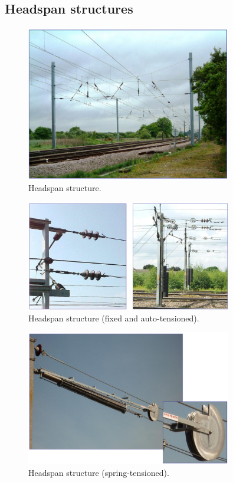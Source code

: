 \subsection{Headspan structures}
\begin{figure}[H]
    \centering
    \includegraphics[width = 0.8\textwidth]{img/figure142.png}
    \caption{Headspan structure.}
\end{figure}
\begin{figure}[H]
    \centering
    \includegraphics[width = 0.8\textwidth]{img/figure143.png}
    \caption{Headspan structure (fixed and auto-tensioned).}
\end{figure}
\begin{figure}[H]
    \centering
    \includegraphics[width = 0.8\textwidth]{img/figure144.png}
    \caption{Headspan structure (spring-tensioned).}
\end{figure}
